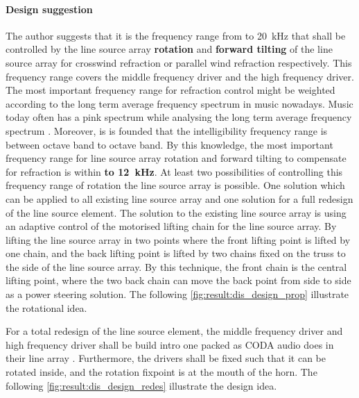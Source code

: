 \paragraph{Design suggestion} 
The author suggests that it is the frequency range from  to \SI{20}{\kilo\hertz}  that shall be controlled by the line source array \textbf{rotation} and \textbf{forward tilting} of the line source array for crosswind refraction or parallel wind refraction respectively. This frequency range covers the middle frequency driver and the high frequency driver. The most important frequency range for refraction control might be weighted according to the long term average frequency spectrum in music nowadays. Music today often has a pink spectrum while analysing the long term average frequency spectrum \citep{elowsson2017long}. Moreover, is is founded that the intelligibility frequency range is between  octave band to  octave band. By this knowledge, the most important frequency range for line source array rotation and forward tilting to compensate for refraction is within \textbf{ to \SI{12}{\kilo\hertz}}. At least two possibilities of controlling this frequency range of rotation the line source array is possible. One solution which can be applied to all existing line source array and one solution for a full redesign of the line source element. The solution to the existing line source array is using an adaptive control of the motorised lifting chain for the line source array. By lifting the line source array in two points where the front lifting point is lifted by one chain, and the back lifting point is lifted by two chains fixed on the truss to the side of the line source array. By this technique, the front chain is the central lifting point, where the two back chain can move the back point from side to side as a power steering solution. The following \autoref{fig:result:dis_design_prop} illustrate the rotational idea.



 For a total redesign of the line source element, the middle frequency driver and high frequency driver shall be build intro one packed as CODA audio does in their line array \citep{coda_ddp}. Furthermore, the drivers shall be fixed such that it can be rotated inside, and the rotation fixpoint is at the mouth of the horn. The following \autoref{fig:result:dis_design_redes} illustrate the design idea.

